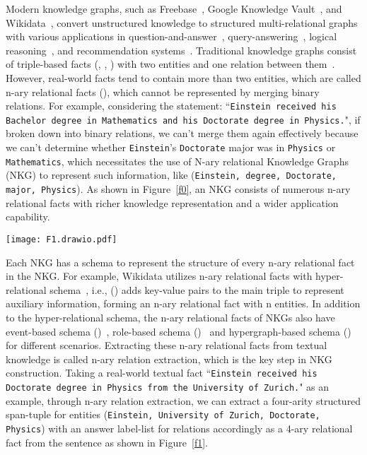 \documentclass{article} \usepackage{iclr2024_conference,times}
\begin{document}
Modern knowledge graphs, such as Freebase~\citep{Freebase}, Google Knowledge Vault~\citep{GoogleKG}, and Wikidata~\citep{Wikidata}, convert unstructured knowledge to structured multi-relational graphs with various applications in question-and-answer~\citep{KGQA}, query-answering~\citep{KGquery}, logical reasoning~\citep{FuzzQE}, and recommendation systems~\citep{KGRS}. Traditional knowledge graphs consist of triple-based facts (, , ) with two entities and one relation between them~\citep{TransE, TuckER}. However, real-world facts tend to contain more than two entities, which are called n-ary relational facts (), which cannot be represented by merging binary relations. For example, considering the statement: ``\texttt{Einstein received his Bachelor degree in Mathematics and his Doctorate degree in Physics.}", if broken down into binary relations, we can't merge them again effectively because we can't determine whether \texttt{Einstein}'s \texttt{Doctorate} major was in \texttt{Physics} or \texttt{Mathematics}, which necessitates the use of N-ary relational Knowledge Graphs (NKG) to represent such information, like (\texttt{Einstein, degree, Doctorate, major, Physics}). As shown in Figure~\ref{f0}, an NKG consists of numerous n-ary relational facts with richer knowledge representation and a wider application capability.

\begin{figure*}[t]
\centering
\texttt{[image: F1.drawio.pdf]}
\caption{An example of fine-grained n-ary relation extraction in four NKG schemas. }
\label{f1}
\end{figure*}

Each NKG has a schema to represent the structure of every n-ary relational fact in the NKG. For example, Wikidata utilizes n-ary relational facts with hyper-relational schema~\citep{Hinge, StarE, GRAN}, i.e., () adds  key-value pairs to the main triple to represent auxiliary information, forming an n-ary relational fact with n entities. In addition to the hyper-relational schema, the n-ary relational facts of NKGs also have event-based schema ()~\citep{EventSurvey,Text2Event}, role-based schema ()~\citep{NaLP,RAM} and hypergraph-based schema ()~\citep{m-TransH,HypE} for different scenarios. Extracting these n-ary relational facts from textual knowledge is called n-ary relation extraction, which is the key step in NKG construction. Taking a real-world textual fact ``\texttt{Einstein received his Doctorate degree in Physics from the University of Zurich.}" as an example, through n-ary relation extraction, we can extract a four-arity structured span-tuple for entities (\texttt{Einstein, University of Zurich, Doctorate, Physics}) with an answer label-list for relations accordingly as a 4-ary relational fact from the sentence as shown in Figure~\ref{f1}.
\end{document}
